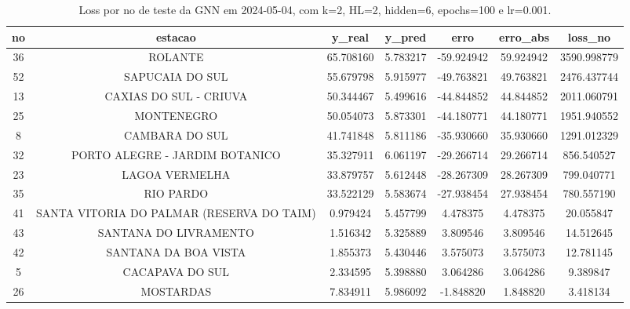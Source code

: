 \begin{table}[h]
\centering
\caption{Loss por no de teste da GNN em 2024-05-04, com k=2, HL=2, hidden=6, epochs=100 e lr=0.001.}
\label{tab:gnn_loss_k2_hl2_h6_e100_d20240504}
\begin{tabular}{ccccccc}
\toprule
no & estacao & y\_real & y\_pred & erro & erro\_abs & loss\_no \\
\midrule
36 & ROLANTE & 65.708160 & 5.783217 & -59.924942 & 59.924942 & 3590.998779 \\
52 & SAPUCAIA DO SUL & 55.679798 & 5.915977 & -49.763821 & 49.763821 & 2476.437744 \\
13 & CAXIAS DO SUL - CRIUVA & 50.344467 & 5.499616 & -44.844852 & 44.844852 & 2011.060791 \\
25 & MONTENEGRO & 50.054073 & 5.873301 & -44.180771 & 44.180771 & 1951.940552 \\
8 & CAMBARA DO SUL & 41.741848 & 5.811186 & -35.930660 & 35.930660 & 1291.012329 \\
32 & PORTO ALEGRE - JARDIM BOTANICO & 35.327911 & 6.061197 & -29.266714 & 29.266714 & 856.540527 \\
23 & LAGOA VERMELHA & 33.879757 & 5.612448 & -28.267309 & 28.267309 & 799.040771 \\
35 & RIO PARDO & 33.522129 & 5.583674 & -27.938454 & 27.938454 & 780.557190 \\
41 & SANTA VITORIA DO PALMAR (RESERVA DO TAIM) & 0.979424 & 5.457799 & 4.478375 & 4.478375 & 20.055847 \\
43 & SANTANA DO LIVRAMENTO & 1.516342 & 5.325889 & 3.809546 & 3.809546 & 14.512645 \\
42 & SANTANA DA BOA VISTA & 1.855373 & 5.430446 & 3.575073 & 3.575073 & 12.781145 \\
5 & CACAPAVA DO SUL & 2.334595 & 5.398880 & 3.064286 & 3.064286 & 9.389847 \\
26 & MOSTARDAS & 7.834911 & 5.986092 & -1.848820 & 1.848820 & 3.418134 \\
\bottomrule
\end{tabular}
\end{table}
